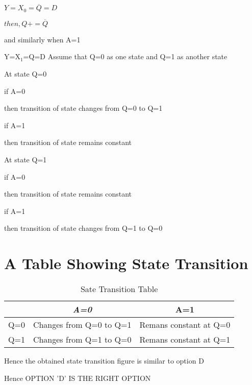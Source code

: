 \documentclass[standalone]{article}
\begin{document}
    $ Y=X_0=\overline{Q}=D$
     
    $ then,Q+  =\overline{Q}$
    
    and  similarly  when  A=1
    
    Y=X$_1$=Q=D
   Assume   that  Q=0  as one  state and Q=1  as another state
   
   At  state Q=0
   
    if  A=0
    
    then transition of state changes from Q=0 to Q=1
    
    if A=1
    
    then transition of state remains constant
    
   At  state  Q=1
   
    if  A=0
    
    then transition of state remains constant
    
    if A=1
    
    then transition of state changes from Q=1 to Q=0
    
\section{A Table Showing State Transition}  
  \begin{table}[h]
   \centering
   \begin{tabular}{|c|c|c|}
   \hline
   \textit{\textbf{  }} & \textit{\textbf{A=0}} &\textbf{A=1}    \\ \hline
    Q=0 &   Changes from  Q=0 to Q=1  &  Remans constant at Q=0    \\ \hline
    Q=1 &   Changes from  Q=1 to Q=0  &  Remans constant at Q=1     \\ \hline
    \hline
   \end{tabular}
  \caption{Sate Transition Table }
\label{tab:table1}
\end{table}
 
    Hence the obtained state transition figure is similar to option D
    
    Hence  OPTION 'D' IS THE RIGHT OPTION
    
\begin{figure}[h]
    \centering
     
\end{figure}
\end{document}
